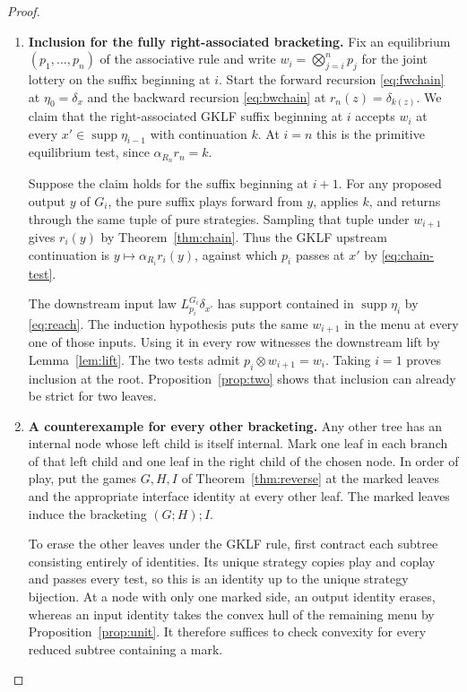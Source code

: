 \documentclass[11pt,a4paper]{article}
\theoremstyle{definition}
\newcommand{\supp}{\operatorname{supp}}
\begin{document}
\begin{proof}\leavevmode
    \begin{enumerate}[titledsteps]
        \item \textbf{Inclusion for the fully right-associated bracketing.} Fix an equilibrium $(p_1,\ldots,p_n)$ of the associative rule and write $w_i=\bigotimes_{j=i}^n p_j$ for the joint lottery on the suffix beginning at $i$. Start the forward recursion \eqref{eq:fwchain} at $\eta_0=\delta_x$ and the backward recursion \eqref{eq:bwchain} at $r_n(z)=\delta_{k(z)}$. We claim that the right-associated GKLF suffix beginning at $i$ accepts $w_i$ at every $x'\in\supp\eta_{i-1}$ with continuation $k$. At $i=n$ this is the primitive equilibrium test, since $\alpha_{R_n}r_n=k$.

        Suppose the claim holds for the suffix beginning at $i+1$. For any proposed output $y$ of $G_i$, the pure suffix plays forward from $y$, applies $k$, and returns through the same tuple of pure strategies. Sampling that tuple under $w_{i+1}$ gives $r_i(y)$ by Theorem~\ref{thm:chain}. Thus the GKLF upstream continuation is $y\mapsto\alpha_{R_i}r_i(y)$, against which $p_i$ passes at $x'$ by \eqref{eq:chain-test}.

        The downstream input law $L_{p_i}^{G_i}\delta_{x'}$ has support contained in $\supp\eta_i$ by \eqref{eq:reach}. The induction hypothesis puts the same $w_{i+1}$ in the menu at every one of those inputs. Using it in every row witnesses the downstream lift by Lemma~\ref{lem:lift}. The two tests admit $p_i\otimes w_{i+1}=w_i$. Taking $i=1$ proves inclusion at the root. Proposition~\ref{prop:two} shows that inclusion can already be strict for two leaves.

        \item \textbf{A counterexample for every other bracketing.} Any other tree has an internal node whose left child is itself internal. Mark one leaf in each branch of that left child and one leaf in the right child of the chosen node. In order of play, put the games $G,H,I$ of Theorem~\ref{thm:reverse} at the marked leaves and the appropriate interface identity at every other leaf. The marked leaves induce the bracketing $(G;H);I$.

        To erase the other leaves under the GKLF rule, first contract each subtree consisting entirely of identities. Its unique strategy copies play and coplay and passes every test, so this is an identity up to the unique strategy bijection. At a node with only one marked side, an output identity erases, whereas an input identity takes the convex hull of the remaining menu by Proposition~\ref{prop:unit}. It therefore suffices to check convexity for every reduced subtree containing a mark.


\end{enumerate}
\end{proof}
\end{document}

